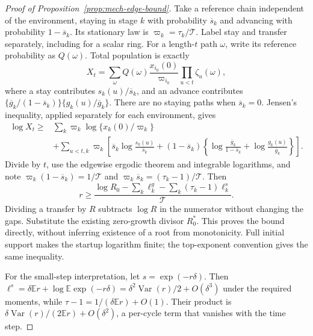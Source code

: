 \begin{proof}[Proof of Proposition~\ref{prop:mech-edge-bound}]
Take a reference chain independent of the environment, staying in stage \(k\) with probability \(\overline s_k\) and advancing with probability \(1-\overline s_k\). Its stationary law is \(\varpi_k=\tau_k/\mathcal T\). Label stay and transfer separately, including for a scalar ring. For a length-\(t\) path \(\omega\), write its reference probability as \(Q(\omega)\). Total population is exactly
\[
 X_t=\sum_\omega Q(\omega)\frac{x_{i_0}(0)}{\varpi_{i_0}}
 \prod_{u<t}\zeta_u(\omega),
\]
where a stay contributes \(s_k(u)/\overline s_k\), and an advance contributes
\(\{\overline g_k/(1-\overline s_k)\}\{g_k(u)/\overline g_k\}\).
There are no staying paths when \(\overline s_k=0\). Jensen's inequality, applied separately for each environment, gives
\begin{align*}
 \log X_t\geq{}&\sum_k\varpi_k\log\{x_k(0)/\varpi_k\}\\
 &+\sum_{u<t,k}\varpi_k\left[\overline s_k\log\frac{s_k(u)}{\overline s_k}
 +(1-\overline s_k)\left\{\log\frac{\overline g_k}{1-\overline s_k}
 +\log\frac{g_k(u)}{\overline g_k}\right\}\right].
\end{align*}
Divide by \(t\), use the edgewise ergodic theorem and integrable logarithms, and note \(\varpi_k(1-\overline s_k)=1/\mathcal T\) and \(\varpi_k\overline s_k=(\tau_k-1)/\mathcal T\). Then
\[
 r\geq\frac{\log R_0-\sum_k\ell_k^g-\sum_k(\tau_k-1)\ell_k^s}{\mathcal T}.
\]
Dividing a transfer by \(R\) subtracts \(\log R\) in the numerator without changing the gaps. Substitute the existing zero-growth divisor \(R_0^*\). This proves the bound directly, without inferring existence of a root from monotonicity. Full initial support makes the startup logarithm finite; the top-exponent convention gives the same inequality.

For the small-step interpretation, let \(s=\exp(-r\delta)\). Then
\(\ell^s=\delta\mathbb E r+\log\mathbb E\exp(-r\delta)
=\delta^2\operatorname{Var}(r)/2+O(\delta^3)\)
under the required moments, while \(\tau-1=1/(\delta\mathbb E r)+O(1)\). Their product is
\(\delta\operatorname{Var}(r)/(2\mathbb E r)+O(\delta^2)\), a per-cycle term that vanishes with the time step.
\end{proof}

